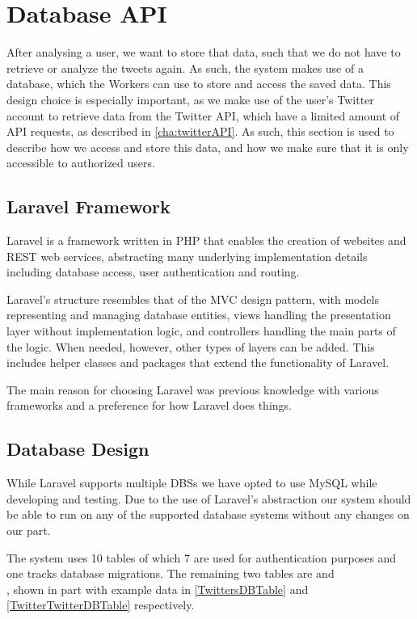\chapter{Database \acs{API}}\label{DatabaseAPI}
After analysing a user, we want to store that data, such that we do not have to
retrieve or analyze the tweets again. As such, the system makes use of a
database, which the Workers can use to store and access the saved data.
This design choice is especially important, as we make use of the user's Twitter
account to retrieve data from the Twitter \ac{API}, which have a limited amount
of API requests, as described in \autoref{cha:twitterAPI}.
As such, this section is used to describe how we access and store this data, and
how we make sure that it is only accessible to authorized users.

\section{Laravel Framework}\label{sec:laravel}
Laravel is a framework written in PHP that enables the creation of websites and
\ac{REST} web services, abstracting many underlying implementation details
including database access, user authentication and routing.\nl

Laravel's structure resembles that of the \ac{MVC} design pattern, with models
representing and managing database entities, views handling the presentation
layer without implementation logic, and controllers handling the main parts of
the logic. When needed, however, other types of layers can be added. This
includes helper classes and packages that extend the functionality of
Laravel.\nl

The main reason for choosing Laravel was previous knowledge with various
frameworks and a preference for how Laravel does things.

\section{Database Design}\label{DBDesign}
While Laravel supports multiple \acp{DBS} \citep{LaravelDBS} we have opted to
use MySQL while developing and testing. Due to the use of Laravel's abstraction our
system should be able to run on any of the supported database systems without
any changes on our part.\nl

The system uses 10 tables of which 7 are used for authentication purposes and
one tracks database migrations. The remaining two tables are 
and \\, shown in part with example data in
\autoref{TwittersDBTable} and \autoref{TwitterTwitterDBTable} respectively.\nl

